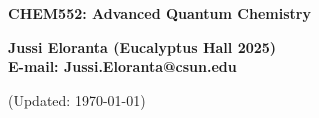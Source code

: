 \documentclass[serif]{beamer}
\begin{document}
\phantom{hauki}
\vfill
\begin{center}
\textbf{CHEM552: Advanced Quantum Chemistry}\\

\vspace{1cm}

\textbf{Jussi Eloranta (Eucalyptus Hall 2025)}\\
\textbf{E-mail: Jussi.Eloranta@csun.edu}\\

\vspace{1cm}


\vspace{1cm}

{\tiny (Updated: \today)}

\end{center}
\vfill
\newpage










\end{document}
